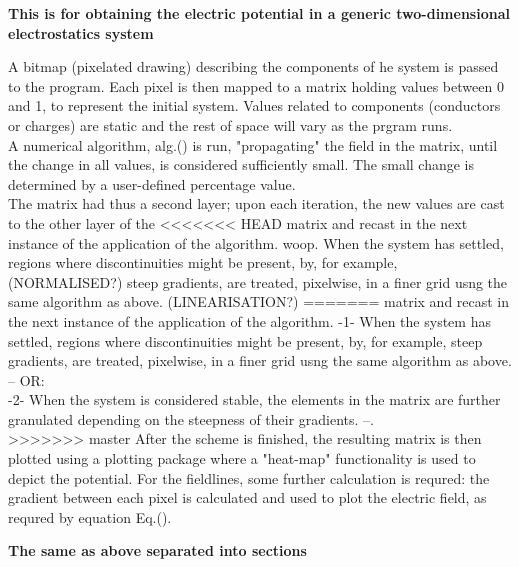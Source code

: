 \documentclass{article}
\begin{document}
  \noindent\textbf{This is for obtaining the electric potential in a generic two-dimensional electrostatics system}

  \vspace{5mm}

	A bitmap (pixelated drawing) describing the components of he system is passed to the program. Each pixel is then 
	 mapped to a matrix holding values between 0 and 1, to represent the initial system. Values related to components
	 (conductors or charges) are static and the rest of space will vary as the prgram runs.\\
	A numerical algorithm, alg.() is run, "propagating" the field in the matrix, until the change in all values, is 
	 considered sufficiently small. The small change is determined by a user-defined percentage value. \\
	The matrix had thus a second layer; upon each iteration, the new values are cast to the other layer of the 
<<<<<<< HEAD
	 matrix and recast in the next instance of the application of the algorithm. woop.
	When the system has settled, regions where discontinuities might be present, by, for example, (NORMALISED?)
	 steep gradients, are treated, pixelwise, in a finer grid usng the same algorithm as above. (LINEARISATION?)
=======
	 matrix and recast in the next instance of the application of the algorithm. 
	-1- When the system has settled, regions where discontinuities might be present, by, for example,
	 steep gradients, are treated, pixelwise, in a finer grid usng the same algorithm as above. -- OR: \\
	-2- When the system is considered stable, the elements in the matrix are further granulated depending on the 
	 steepness of their gradients. --. \\
>>>>>>> master
	After the scheme is finished, the resulting matrix is then plotted using a plotting package where  a "heat-map" 
	 functionality is used to depict the potential. For the fieldlines, some further calculation is requred: the 
	 gradient between each pixel is calculated and used to plot the electric field, as requred by equation Eq.().

\vspace{7.5mm}

\noindent\textbf{The same as above separated into sections}

\vspace{5mm}
\end{document}

